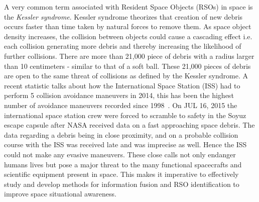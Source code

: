 \documentclass[]{aiaa-tc}%
\begin{document}
 A very common term associated with Resident Space Objects (RSOs) in space is the \textit{Kessler syndrome}. Kessler syndrome theorizes that creation of new debris occurs faster than time taken by natural forces to remove them. As space object density  increases, the collision between objects could cause a cascading effect i.e. each collision generating more debris and thereby increasing the likelihood of further collisions. There are more than 21,000 piece of debris with a radius larger than 10 centimeters  - similar to that of a soft ball\cite{nasa_nasa_2015}. These 21,000 pieces of debris are open to the same threat of collisions as defined by the Kessler syndrome. A recent statistic talks about how the International Space Station (ISS) had to perform 5 collision avoidance maneuvers in 2014, this has been the highest number of avoidance maneuvers recorded since 1998~\cite{nasa_orbital_2015}. On JUL 16, 2015 the international space station crew were forced to scramble to safety in the Soyuz escape capsule after NASA received data on a fast approaching space debris\cite{evasive_2015}. The data regarding a debris being in close proximity, and on a probable collision course with the ISS was  received late and was imprecise as well. Hence the ISS could not make any evasive maneuvers. These close calls not only endanger humans lives but pose a major threat to the many functional spacecrafts and scientific equipment present in space. This makes it imperative to effectively study and develop methods for information fusion and RSO identification to improve space situational awareness.\\
\end{document}
